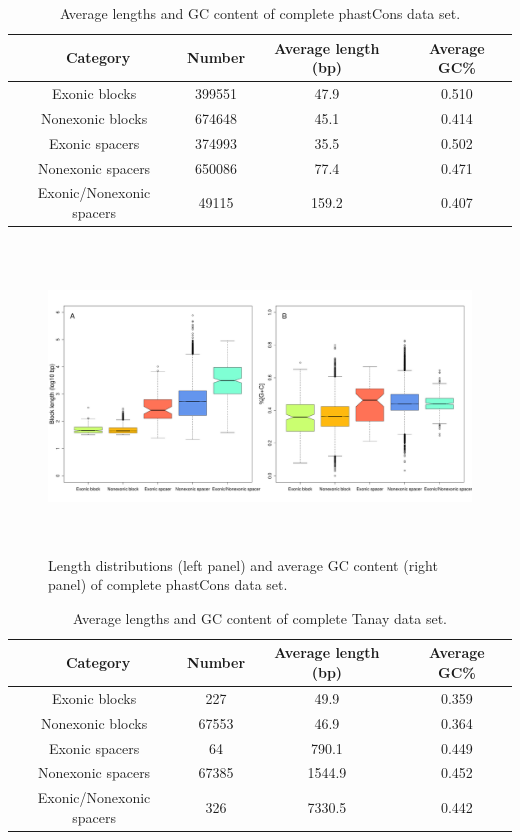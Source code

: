 \documentclass[12pt]{report}
\begin{document}
\begin{table}[ht]
\centering
\begin{tabular}{c c c c}
\hline\hline
\ Category & Number & Average length (bp) & Average GC\% \\ [0.5ex]
\hline
Exonic blocks & 399551 & 47.9 & 0.510 \\
Nonexonic blocks & 674648 & 45.1 & 0.414 \\
Exonic spacers & 374993 & 35.5 & 0.502 \\
Nonexonic spacers & 650086 & 77.4 & 0.471 \\
Exonic/Nonexonic spacers & 49115 & 159.2 & 0.407 \\ [1ex] 
\hline
\end{tabular}
\caption[Caption for LOF]{\centering Average lengths and GC content of complete phastCons data set.}
\end{table}

\begin{figure}[htbp]
\centering
\includegraphics[width=\textwidth, height=82mm]{whole_tanay_lenghts_GC_latex}
\caption{Length distributions (left panel) and average GC content (right panel) of complete phastCons data set.}
\label{fig:blocks_spacers_distributions_tan}
\end{figure}

\begin{table}[ht]
\centering
\begin{tabular}{c c c c}
\hline\hline
\ Category & Number & Average length (bp) & Average GC\% \\ [0.5ex]
\hline
Exonic blocks & 227 & 49.9 & 0.359 \\
Nonexonic blocks & 67553 & 46.9 & 0.364 \\
Exonic spacers & 64 & 790.1 & 0.449 \\
Nonexonic spacers & 67385 & 1544.9 & 0.452 \\
Exonic/Nonexonic spacers & 326 & 7330.5 & 0.442 \\ [1ex] 
\hline
\end{tabular}
\caption[Caption for LOF]{\centering Average lengths and GC content of complete Tanay data set.}
\end{table}
\end{document}
